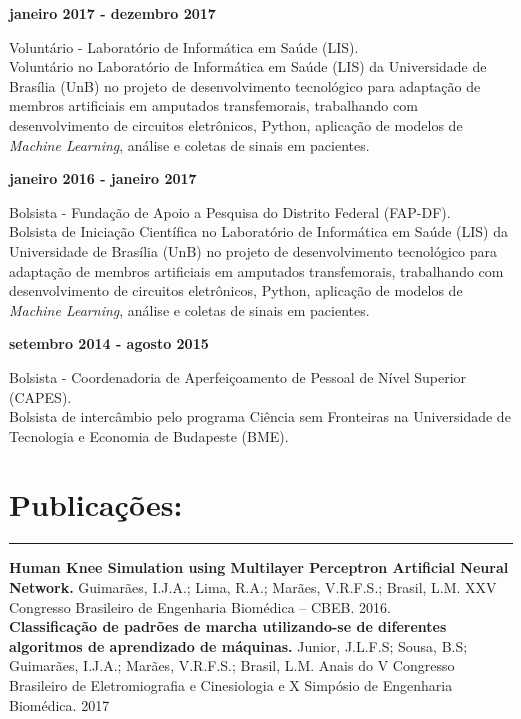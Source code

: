\documentclass[11pt]{article}
\begin{document}
\newpage
\textbf{janeiro 2017 - dezembro 2017}
\begin{addmargin}{0.5cm}
Voluntário - Laboratório de Informática em Saúde (LIS). \\
Voluntário no Laboratório de Informática em Saúde (LIS) da Universidade de
Brasília (UnB) no projeto
de desenvolvimento tecnológico para adaptação de membros artificiais em amputados transfemorais,
trabalhando com desenvolvimento de circuitos eletrônicos, Python, aplicação de modelos de 
\textit{Machine Learning}, análise e coletas de sinais em pacientes.\\
\end{addmargin}

\textbf{janeiro 2016 - janeiro 2017}
\begin{addmargin}{0.5cm}
Bolsista - Fundação de Apoio a Pesquisa do Distrito Federal (FAP-DF).\\
Bolsista de Iniciação Científica no Laboratório de Informática em Saúde (LIS)  da Universidade de
Brasília (UnB) no projeto
de desenvolvimento tecnológico para adaptação de membros artificiais em amputados transfemorais,
trabalhando com desenvolvimento de circuitos eletrônicos, Python, aplicação de modelos de 
\textit{Machine Learning}, análise e coletas de sinais em pacientes.\\
\end{addmargin}

\textbf{setembro 2014 - agosto 2015}
    \begin{addmargin}{0.5cm}
        Bolsista - Coordenadoria de Aperfeiçoamento de Pessoal de Nível Superior (CAPES). \\
        Bolsista de intercâmbio pelo programa Ciência sem Fronteiras na Universidade de Tecnologia e Economia de Budapeste (BME). 
\end{addmargin}


\section{Publicações:}
\hrule \vspace{0.1cm}

\textbf{Human Knee Simulation using Multilayer Perceptron Artificial Neural Network.}
Guimarães, I.J.A.; Lima, R.A.; Marães, V.R.F.S.; Brasil, L.M.
XXV Congresso Brasileiro de Engenharia Biomédica – CBEB. 2016. \\

\textbf{Classificação de padrões de marcha utilizando-se de diferentes algoritmos de aprendizado de máquinas.}
Junior, J.L.F.S; Sousa, B.S; Guimarães, I.J.A.; Marães, V.R.F.S.; Brasil, L.M.
Anais do V Congresso Brasileiro de Eletromiografia e Cinesiologia e X Simpósio de Engenharia Biomédica. 2017 \\
\end{document}
